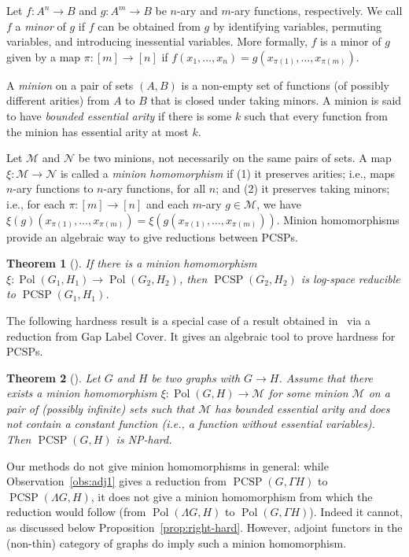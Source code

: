 \documentclass[11pt,a4paper]{scrartcl}
\newtheorem{theorem}{Theorem}
\numberwithin{theorem}{section}
\theoremstyle{definition}
\DeclareMathOperator{\PCSP}{PCSP}
\DeclareMathOperator{\Pol}{Pol}
\begin{document}
Let $f:A^n\to B$ and $g:A^m\to B$ be $n$-ary and $m$-ary functions,
respectively. We call $f$ a \emph{minor} of $g$ if $f$ can be obtained from $g$ by
identifying variables, permuting variables, and introducing inessential
variables. More formally, $f$ is a minor of $g$ given by a map
$\pi:[m]\to[n]$ if $f(x_1,\ldots,x_n)=g(x_{\pi(1)},\ldots,x_{\pi(m)})$.

A \emph{minion} on a pair of sets $(A,B)$ is a non-empty set of functions (of
possibly different arities) from $A$ to $B$ that is closed under taking minors.
A minion is said to have \emph{bounded essential arity} if there is some $k$
such that every function from the minion has essential arity at most $k$.

Let $\mathscr M $ and $\mathscr N $ be two minions, not necessarily on the same pairs of
sets. A map $\xi:\mathscr M\to\mathscr N$ is called a \emph{minion
homomorphism} if (1) it preserves arities; i.e., maps $n$-ary functions to
$n$-ary functions, for all $n$; and (2) it preserves taking minors; i.e., for
each $\pi:[m]\to[n]$ and each $m$-ary $g\in\mathscr M$, we have
$\xi(g)(x_{\pi(1)},\ldots,x_{\pi(m)})=\xi(g(x_{\pi(1)},\ldots,x_{\pi(m)}))$.
Minion homomorphisms provide an algebraic way to give reductions between PCSPs.

\begin{theorem}[\cite{BulinKO18}]
	If there is a minion homomorphism $\xi \colon \Pol(G_1,H_1) \to \Pol(G_2,H_2)$,
	then $\PCSP(G_2,H_2)$ is log-space reducible to $\PCSP(G_1,H_1)$.
\end{theorem}


The following hardness result is a special case of a result obtained
in~\cite{BulinKO18} via a reduction from Gap Label Cover. It gives an algebraic
tool to prove hardness for PCSPs.

\begin{theorem}[\cite{BulinKO18}]\label{thm:minbndarity}
Let $G$ and $H$ be two graphs with $G\to H$. Assume that there exists a minion
  homomorphism $\xi:\Pol(G,H)\to\mathscr M$ for some minion $\mathscr M$ on a
  pair of (possibly infinite) sets such that $\mathscr M$ has bounded essential
  arity and does not contain a constant function (i.e., a function without
  essential variables). Then $\PCSP(G,H)$ is NP-hard.
\end{theorem}

Our methods do not give minion homomorphisms in general: while Observation~\ref{obs:adj1} gives a reduction from $\PCSP(G,\Gamma H)$ to $\PCSP(\Lambda G, H)$, it does not give a minion homomorphism from which the reduction would follow (from $\Pol(\Lambda G, H)$ to $\Pol(G,\Gamma H)$).
Indeed it cannot, as discussed below Proposition~\ref{prop:right-hard}.
However, adjoint functors in the (non-thin) category of graphs do imply such a minion homomorphism.
\end{document}
